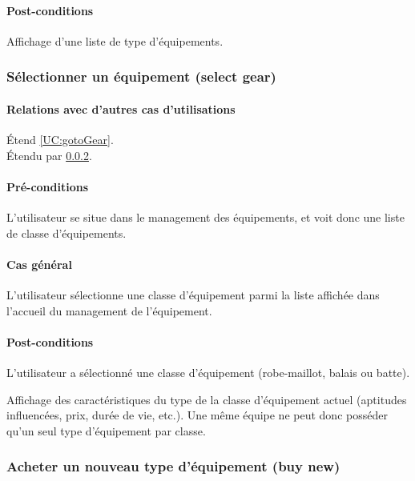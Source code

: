 \begin{list}{}{\leftmargin=1.5em}
\paragraph{Post-conditions}
\begin{list}{}{\leftmargin=1.5em}
\item{Affichage d'une liste de type d'équipements.}
\end{list}

 \subsubsection{Sélectionner un équipement (select gear)}
\label{UC:selectGear}
\paragraph{Relations avec d'autres cas d'utilisations}
Étend \ref{UC:gotoGear}.\\
Étendu par \ref{UC:buyGear}.
\paragraph{Pré-conditions}
\begin{list}{}{\leftmargin=1.5em}
\item{L'utilisateur se situe dans le management des équipements, et voit donc une liste de classe d'équipements.}
\end{list}
\paragraph{Cas général}
L'utilisateur sélectionne une classe d'équipement parmi la liste affichée dans l'accueil du management de l'équipement.
\paragraph{Post-conditions}
\begin{list}{}{\leftmargin=1.5em}
\item{L'utilisateur a sélectionné une classe d'équipement (robe-maillot, balais ou batte).}
\item{Affichage des caractéristiques du type de la classe d'équipement actuel (aptitudes influencées, prix, durée de vie, etc.). Une même équipe ne peut donc posséder qu'un seul type d'équipement par classe.}
\end{list}

\subsubsection{Acheter un nouveau type d'équipement (buy new)}
\label{UC:buyGear}

\end{list}
